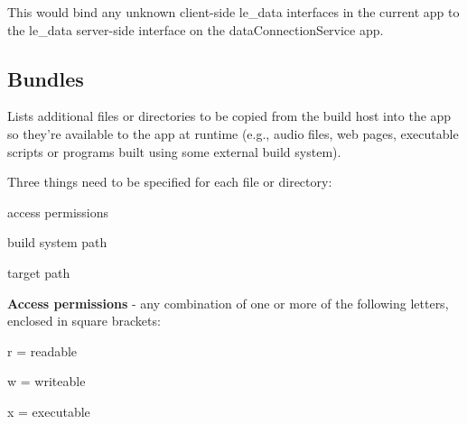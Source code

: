 This would bind any unknown client-\/side {\ttfamily le\+\_\+data} interfaces in the current app to the {\ttfamily le\+\_\+data} server-\/side interface on the {\ttfamily data\+Connection\+Service} app.\hypertarget{def_files_adef_defFilesAdef_bundles}{}\subsection{Bundles}\label{def_files_adef_defFilesAdef_bundles}
Lists additional files or directories to be copied from the build host into the app so they’re available to the app at runtime (e.\+g., audio files, web pages, executable scripts or programs built using some external build system).



Three things need to be specified for each file or directory\+:
\begin{DoxyItemize}
\item access permissions
\item build system path
\item target path
\end{DoxyItemize}

{\bfseries Access permissions} -\/ any combination of one or more of the following letters, enclosed in square brackets\+:
\begin{DoxyItemize}
\item r = readable
\item w = writeable
\item x = executable
\end{DoxyItemize}

